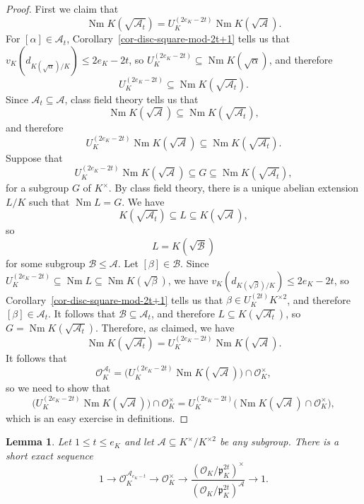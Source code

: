 \documentclass[11pt]{amsart}
\theoremstyle{theorem}
\newtheorem{lemma}[theorem]{Lemma}
\theoremstyle{example}
\theoremstyle{definition}
\numberwithin{theorem}{section}
\numberwithin{theorem}{section}
\DeclareMathOperator{\Nm}{Nm}
\newcommand{\co}{\mathcal{O}}
\newcommand{\p}{\mathfrak{p}}
\begin{document}
\begin{proof}
    First we claim that 
    $$
    \Nm K(\sqrt{\mathcal{A}_t}) = U_K^{(2e_K - 2t)}\Nm K(\sqrt{\mathcal{A}}). 
    $$
    For $[\alpha] \in \mathcal{A}_t$, Corollary~\ref{cor-disc-square-mod-2t+1} tells us that $v_K(d_{K(\sqrt{\alpha})/K}) \leq 2e_K - 2t$, so $U_K^{(2e_K - 2t)}\subseteq \Nm K(\sqrt{\alpha})$, and therefore 
    $$
    U_K^{(2e_K - 2t)}\subseteq \Nm K(\sqrt{\mathcal{A}_t}). 
    $$
    Since $\mathcal{A}_t \subseteq \mathcal{A}$, class field theory tells us that 
    $$
    \Nm K(\sqrt{\mathcal{A}}) \subseteq \Nm K(\sqrt{\mathcal{A}_t}),
    $$ 
    and therefore
    $$
    U_K^{(2e_K - 2t)}\Nm K(\sqrt{\mathcal{A}}) \subseteq \Nm K(\sqrt{\mathcal{A}_t}).
    $$
    Suppose that 
    $$
    U_K^{(2e_K - 2t)}\Nm K(\sqrt{\mathcal{A}}) \subseteq G \subseteq \Nm K(\sqrt{\mathcal{A}_t}),
    $$
    for a subgroup $G$ of $K^\times$. By class field theory, there is a unique abelian extension $L/K$ such that $\Nm L = G$. We have  
    $$
    K(\sqrt{\mathcal{A}_t}) \subseteq L \subseteq K(\sqrt{\mathcal{A}}),
    $$
    so 
    $$
    L = K(\sqrt{\mathcal{B}})
    $$
    for some subgroup $\mathcal{B} \leq \mathcal{A}$. Let $[\beta] \in \mathcal{B}$. Since $U_K^{(2e_K - 2t)}\subseteq \Nm L \subseteq \Nm K(\sqrt{\beta})$, we have 
    $v_K(d_{K(\sqrt{\beta})/K}) \leq 2e_K - 2t$, so Corollary~\ref{cor-disc-square-mod-2t+1} tells us that $\beta \in U_K^{(2t)}K^{\times 2}$, and therefore $[\beta] \in \mathcal{A}_t$. It follows that $\mathcal{B}\subseteq \mathcal{A}_t$, and therefore $L \subseteq K(\sqrt{\mathcal{A}_t})$, so $G = \Nm K(\sqrt{\mathcal{A}_t})$. Therefore, as claimed, we have 
    $$
    \Nm K(\sqrt{\mathcal{A}_t}) = U_K^{(2e_K - 2t)}\Nm K(\sqrt{\mathcal{A}}). 
    $$
    It follows that 
    $$
    \co_K^{\mathcal{A}_t} = \Big(
    U_K^{(2e_K - 2t)} \Nm K(\sqrt{\mathcal{A}})     
    \Big) \cap \co_K^\times,
    $$
    so we need to show that 
    $$
    \Big(
    U_K^{(2e_K - 2t)} \Nm K(\sqrt{\mathcal{A}})     
    \Big) \cap \co_K^\times = U_K^{(2e_K - 2t)}\Big(
        \Nm K(\sqrt{\mathcal{A}})  \cap \co_K^\times
    \Big),
    $$
    which is an easy exercise in definitions.
\end{proof}
\begin{lemma}
    \label{lem-ES-for-OK/p2t-A}
    Let $1 \leq t \leq e_K$ and let $\mathcal{A}\subseteq K^\times / K^{\times 2}$ be any subgroup. There is a short exact sequence 
    $$
    1 \to \co_K^{\mathcal{A}_{e_K - t}} \to \co_K^\times \to \frac{(\co_K/\p_K^{2t})^\times}{(\co_K/\p_K^{2t})^\mathcal{A}} \to 1.
    $$
\end{lemma}
\end{document}
